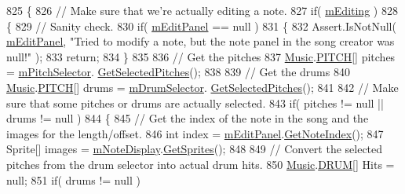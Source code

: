 \begin{DoxyCode}
825     \{
826         \textcolor{comment}{// Make sure that we're actually editing a note.}
827         \textcolor{keywordflow}{if}( \hyperlink{group___s_c_priv_var_ga5aec1c6ae4159b96ce466ee6b1da3371}{mEditing} )
828         \{
829             \textcolor{comment}{// Sanity check.}
830             \textcolor{keywordflow}{if}( \hyperlink{group___s_c_priv_var_ga0f5cfc2d0492190ded3fbda5b43b45e4}{mEditPanel} == null )
831             \{
832                 Assert.IsNotNull( \hyperlink{group___s_c_priv_var_ga0f5cfc2d0492190ded3fbda5b43b45e4}{mEditPanel}, \textcolor{stringliteral}{"Tried to modify a note, but the note panel in the
       song creator was null!"} );
833                 \textcolor{keywordflow}{return};
834             \}
835 
836             \textcolor{comment}{// Get the pitches }
837             \hyperlink{class_music}{Music}.\hyperlink{group___music_enums_ga508f69b199ea518f935486c990edac1d}{PITCH}[] pitches = \hyperlink{group___s_c_priv_var_gac32e68713b2b504807f52acef445df1c}{mPitchSelector}.
      \hyperlink{group___s_c_handlers_gac7a3634aba275f03dffe9f45e444dbf1}{GetSelectedPitches}();
838 
839             \textcolor{comment}{// Get the drums}
840             \hyperlink{class_music}{Music}.\hyperlink{group___music_enums_ga508f69b199ea518f935486c990edac1d}{PITCH}[] drums = \hyperlink{group___s_c_priv_var_ga3f1c71d8cabe505745220d728c6f97bc}{mDrumSelector}.
      \hyperlink{group___s_c_handlers_gac7a3634aba275f03dffe9f45e444dbf1}{GetSelectedPitches}();
841 
842             \textcolor{comment}{// Make sure that some pitches or drums are actually selected.}
843             \textcolor{keywordflow}{if}( pitches != null || drums != null )
844             \{
845                 \textcolor{comment}{// Get the index of the note in the song and the images for the length/offset.}
846                 \textcolor{keywordtype}{int} index = \hyperlink{group___s_c_priv_var_ga0f5cfc2d0492190ded3fbda5b43b45e4}{mEditPanel}.\hyperlink{group___s_c___n_d_p_unity_ga8beef050026ade4ba4ccb574c414d24e}{GetNoteIndex}();
847                 Sprite[] images = \hyperlink{group___s_c_priv_var_ga19cefeb7077126193c7f60d07dfdf32c}{mNoteDisplay}.\hyperlink{class_note_display_container_a71bea931f237005ffb04e33baef71bef}{GetSprites}();
848 
849                 \textcolor{comment}{// Convert the selected pitches from the drum selector into actual drum hits.}
850                 \hyperlink{class_music}{Music}.\hyperlink{group___music_enums_gade475b4382c7066d1af13e7c13c029b6}{DRUM}[] Hits = null;
851                 \textcolor{keywordflow}{if}( drums != null )

\end{DoxyCode}

